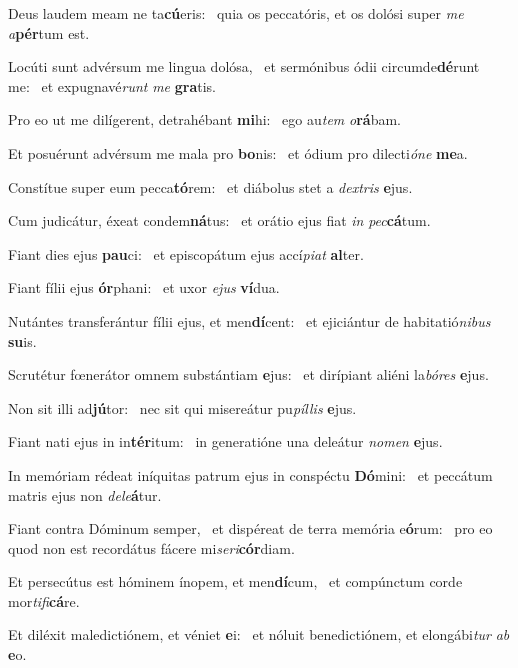 \item Deus laudem meam ne ta\textbf{cú}eris:~\psstar{} quia os peccatóris, et os dolósi super \textit{me} \textit{a}\textbf{pér}tum est.
\item Locúti sunt advérsum me lingua dolósa,~\pscross{} et sermónibus ódii circumde\textbf{dé}runt me:~\psstar{} et expugnavé\textit{runt} \textit{me} \textbf{gra}tis.
\item Pro eo ut me dilígerent, detrahébant \textbf{mi}hi:~\psstar{} ego au\textit{tem} \textit{o}\textbf{rá}bam.
\item Et posuérunt advérsum me mala pro \textbf{bo}nis:~\psstar{} et ódium pro dilecti\textit{óne} \textbf{me}a.
\item Constítue super eum pecca\textbf{tó}rem:~\psstar{} et diábolus stet a \textit{dextris} \textbf{e}jus.
\item Cum judicátur, éxeat condem\textbf{ná}tus:~\psstar{} et orátio ejus fiat \textit{in} \textit{pec}\textbf{cá}tum.
\item Fiant dies ejus \textbf{pau}ci:~\psstar{} et episcopátum ejus accí\textit{piat} \textbf{al}ter.
\item Fiant fílii ejus \textbf{ór}phani:~\psstar{} et uxor \textit{ejus} \textbf{ví}dua.
\item Nutántes transferántur fílii ejus, et men\textbf{dí}cent:~\psstar{} et ejiciántur de habitatió\textit{nibus} \textbf{su}is.
\item Scrutétur fœnerátor omnem substántiam \textbf{e}jus:~\psstar{} et dirípiant aliéni la\textit{bóres} \textbf{e}jus.
\item Non sit illi ad\textbf{jú}tor:~\psstar{} nec sit qui misereátur pu\textit{píllis} \textbf{e}jus.
\item Fiant nati ejus in in\textbf{tér}itum:~\psstar{} in generatióne una deleátur \textit{nomen} \textbf{e}jus.
\item In memóriam rédeat iníquitas patrum ejus in conspéctu \textbf{Dó}mini:~\psstar{} et peccátum matris ejus non \textit{dele}\textbf{á}tur.
\item Fiant contra Dóminum semper,~\pscross{} et dispéreat de terra memória e\textbf{ó}rum:~\psstar{} pro eo quod non est recordátus fácere mi\textit{seri}\textbf{cór}diam.
\item Et persecútus est hóminem ínopem, et men\textbf{dí}cum,~\psstar{} et compúnctum corde mor\textit{tifi}\textbf{cá}re.
\item Et diléxit maledictiónem, et véniet \textbf{e}i:~\psstar{} et nóluit benedictiónem, et elongábi\textit{tur} \textit{ab} \textbf{e}o.
